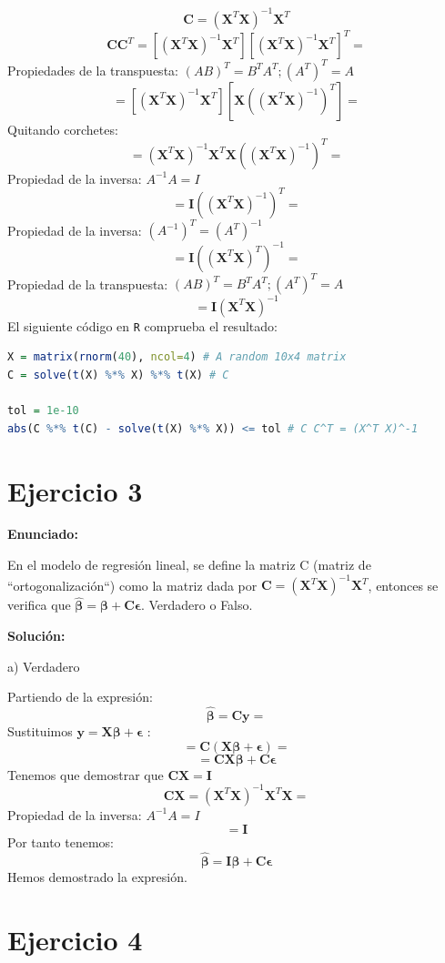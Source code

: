 \documentclass[a4paper]{article}
\begin{document}
\[ \mathbf{C} = (\mathbf{X}^T\mathbf{X})^{-1}\mathbf{X}^T   \]
\[ \mathbf{C}\mathbf{C}^T = [(\mathbf{X}^T\mathbf{X})^{-1}\mathbf{X}^T][(\mathbf{X}^T\mathbf{X})^{-1}\mathbf{X}^T]^T =\]
Propiedades de la transpuesta: $(AB)^T = B^TA^T; (A^T)^T = A$
\[ = [(\mathbf{X}^T\mathbf{X})^{-1}\mathbf{X}^T][\mathbf{X}((\mathbf{X}^T\mathbf{X})^{-1})^T] = \]
Quitando corchetes:
\[ = (\mathbf{X}^T\mathbf{X})^{-1}\mathbf{X}^T\mathbf{X}((\mathbf{X}^T\mathbf{X})^{-1})^T = \]
Propiedad de la inversa: $A^{-1}A = I$
\[ = \mathbf{I}((\mathbf{X}^T\mathbf{X})^{-1})^T = \]
Propiedad de la inversa: $(A^{-1})^T = (A^T)^{-1}$
\[ = \mathbf{I}((\mathbf{X}^T\mathbf{X})^T)^{-1} = \]
Propiedad de la transpuesta: $(AB)^T = B^TA^T; (A^T)^T = A$
\[ = \mathbf{I}(\mathbf{X}^T\mathbf{X})^{-1} \]
El siguiente código en \verb|R| comprueba el resultado:
\begin{lstlisting}[language=R]
X = matrix(rnorm(40), ncol=4) # A random 10x4 matrix
C = solve(t(X) %*% X) %*% t(X) # C

tol = 1e-10
abs(C %*% t(C) - solve(t(X) %*% X)) <= tol # C C^T = (X^T X)^-1
\end{lstlisting}

\section{Ejercicio 3}

\textbf{Enunciado:}\par
En el modelo de regresión lineal, se define la matriz C (matriz de ``ortogonalización``) como la matriz dada por $\mathbf{C} = (\mathbf{X}^T\mathbf{X})^{-1}\mathbf{X}^T$, entonces se verifica que $\bm{\widehat{\beta}} = \bm{\beta} + \mathbf{C}\bm{\epsilon}$. Verdadero o Falso.\par
\textbf{Solución:}\par
a) Verdadero

Partiendo de la expresión:
\[ \bm{\widehat{\beta}} = \mathbf{C}\mathbf{y} = \]
Sustituimos $\mathbf{y} = \mathbf{X}\bm{\beta} + \bm{\epsilon}$ :
\[ = \mathbf{C}(\mathbf{X}\bm{\beta} + \bm{\epsilon}) = \]
\[ = \mathbf{C}\mathbf{X}\bm{\beta} + \mathbf{C}\bm{\epsilon} \]
Tenemos que demostrar que $\mathbf{C}\mathbf{X} = \mathbf{I}$
\[ \mathbf{C}\mathbf{X} = (\mathbf{X}^T\mathbf{X})^{-1}\mathbf{X}^T\mathbf{X} = \]
Propiedad de la inversa: $A^{-1}A = I$
\[ = \mathbf{I} \]
Por tanto tenemos:
\[ \bm{\widehat{\beta}} = \mathbf{I}\bm{\beta} + \mathbf{C}\bm{\epsilon} \]
Hemos demostrado la expresión.

\section{Ejercicio 4}
\end{document}
